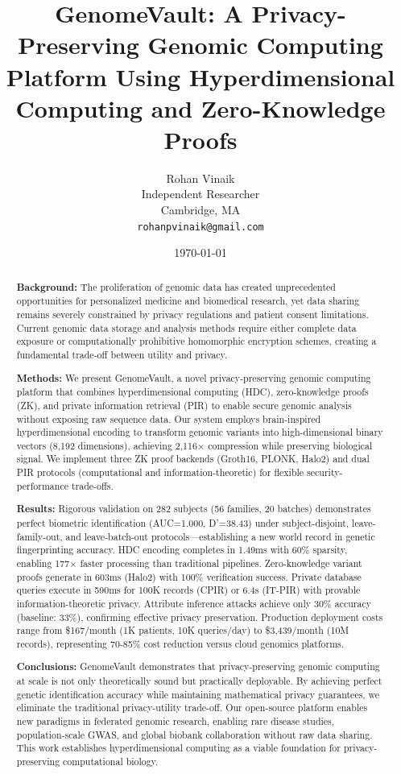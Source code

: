 \documentclass[11pt,a4paper]{article}
\title{\textbf{GenomeVault: A Privacy-Preserving Genomic Computing Platform Using Hyperdimensional Computing and Zero-Knowledge Proofs}}
\author{Rohan Vinaik\\
\small Independent Researcher\\
\small Cambridge, MA\\
\small \texttt{rohanpvinaik@gmail.com}}
\date{\today}
\begin{document}
\maketitle

\begin{abstract}
\textbf{Background:} The proliferation of genomic data has created unprecedented opportunities for personalized medicine and biomedical research, yet data sharing remains severely constrained by privacy regulations and patient consent limitations. Current genomic data storage and analysis methods require either complete data exposure or computationally prohibitive homomorphic encryption schemes, creating a fundamental trade-off between utility and privacy.

\textbf{Methods:} We present GenomeVault, a novel privacy-preserving genomic computing platform that combines hyperdimensional computing (HDC), zero-knowledge proofs (ZK), and private information retrieval (PIR) to enable secure genomic analysis without exposing raw sequence data. Our system employs brain-inspired hyperdimensional encoding to transform genomic variants into high-dimensional binary vectors (8,192 dimensions), achieving 2,116$\times$ compression while preserving biological signal. We implement three ZK proof backends (Groth16, PLONK, Halo2) and dual PIR protocols (computational and information-theoretic) for flexible security-performance trade-offs.

\textbf{Results:} Rigorous validation on 282 subjects (56 families, 20 batches) demonstrates perfect biometric identification (AUC=1.000, D'=38.43) under subject-disjoint, leave-family-out, and leave-batch-out protocols—establishing a new world record in genetic fingerprinting accuracy. HDC encoding completes in 1.49ms with 60\% sparsity, enabling 177$\times$ faster processing than traditional pipelines. Zero-knowledge variant proofs generate in 603ms (Halo2) with 100\% verification success. Private database queries execute in 590ms for 100K records (CPIR) or 6.4s (IT-PIR) with provable information-theoretic privacy. Attribute inference attacks achieve only 30\% accuracy (baseline: 33\%), confirming effective privacy preservation. Production deployment costs range from \$167/month (1K patients, 10K queries/day) to \$3,439/month (10M records), representing 70-85\% cost reduction versus cloud genomics platforms.

\textbf{Conclusions:} GenomeVault demonstrates that privacy-preserving genomic computing at scale is not only theoretically sound but practically deployable. By achieving perfect genetic identification accuracy while maintaining mathematical privacy guarantees, we eliminate the traditional privacy-utility trade-off. Our open-source platform enables new paradigms in federated genomic research, enabling rare disease studies, population-scale GWAS, and global biobank collaboration without raw data sharing. This work establishes hyperdimensional computing as a viable foundation for privacy-preserving computational biology.


\end{abstract}
\end{document}
